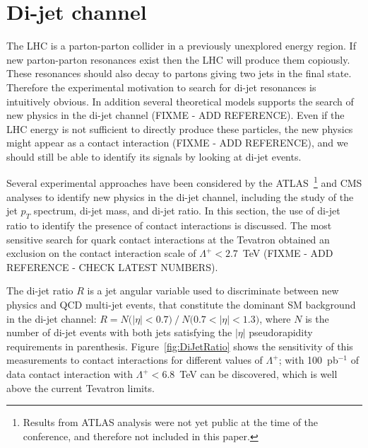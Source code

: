 \documentclass{cimento}
\begin{document}
\section{Di-jet channel} \label{dijet}
The LHC is a parton-parton collider in a previously 
unexplored energy region. If new parton-parton resonances 
exist then the LHC will produce them copiously. 
These resonances should also decay to partons giving two jets in the final state. 
Therefore the experimental motivation to search for di-jet 
resonances is intuitively obvious. In addition several theoretical 
models supports the search of new physics in the di-jet channel
(FIXME - ADD REFERENCE). Even if the LHC energy is not sufficient 
to directly produce these particles, the new physics might appear as 
a contact interaction (FIXME - ADD REFERENCE), 
and we should still be able to identify its signals by looking 
at di-jet events.

Several experimental approaches have been considered by the 
ATLAS~\footnote{Results from ATLAS analysis were not yet public at the time 
of the conference, and therefore not included in this paper.} 
and CMS analyses to identify new physics in the di-jet channel, 
including the study of the jet $p_{T}$ spectrum, di-jet mass, and di-jet ratio.
In this section, the use of di-jet ratio to identify the presence 
of contact interactions is discussed. The most sensitive 
search for quark contact interactions at the Tevatron obtained an exclusion on 
the contact interaction scale of $\Lambda^{+} < 2.7$~TeV (FIXME - ADD REFERENCE - 
CHECK LATEST NUMBERS).  

The di-jet ratio $R$ is a jet angular variable used to 
discriminate between new physics and QCD multi-jet events, 
that constitute the dominant SM background in the di-jet channel:  
$R=N\mbox{(}|\eta|<0.7\mbox{)}~/~N\mbox{(}0.7<|\eta|< 1.3 \mbox{)}$, 
where $N$ is the number of di-jet events with both jets satisfying the 
$|\eta|$ pseudorapidity requirements in parenthesis.
Figure~\ref{fig:DiJetRatio} shows the sensitivity of this measurements to 
contact interactions for different values of $\Lambda^{+}$; 
with 100~pb$^{-1}$ of data contact interaction with
$\Lambda^{+} < 6.8$~TeV can be discovered, 
which is well above the current Tevatron limits.
 
\end{document}
